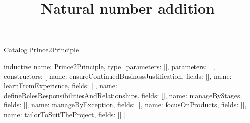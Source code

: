 \begin{lexlean}{Catalog.Prince2Principle}
\title{Natural number addition}
\begin{semanticmodule}
inductive{
  name: Prince2Principle,
  type_parameters: [],
  parameters: [],
  constructors: [
    {name: ensureContinuedBusinessJustification, fields: []},
    {name: learnFromExperience, fields: []},
    {name: defineRolesResponsibilitiesAndRelationships, fields: []},
    {name: manageByStages, fields: []},
    {name: manageByException, fields: []},
    {name: focusOnProducts, fields: []},
    {name: tailorToSuitTheProject, fields: []}
  ]
}
\end{semanticmodule}
\end{lexlean}
